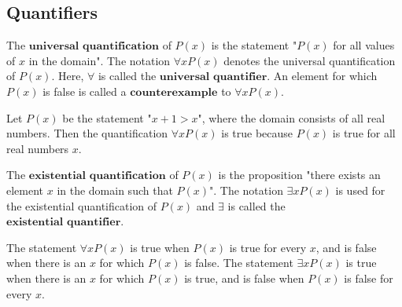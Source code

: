\documentclass{article}
\newtheorem{definition}{Definition}[subsection]
\newtheorem{remark}{Remark}[subsection]
\newtheorem{example}{Example}[subsection]
\begin{document}
\subsection{Quantifiers}
\begin{tcolorbox}
[colback=blue!5!white,colframe=blue!75!black,title=\begin{definition}
\end{definition}]
The $\textbf{universal quantification}$ of $P(x)$ is the statement "$P(x)$ for all values of $x$ in the domain". The notation $\forall xP(x)$ denotes the universal quantification of $P(x)$. Here, $\forall$ is called the $\textbf{universal quantifier}$. An element for which $P(x)$ is false is called a $\textbf{counterexample}$ to $\forall xP(x)$.
\end{tcolorbox}
\begin{tcolorbox}
[colback=red!5!white,colframe=red!75!black,title=\begin{example}
\end{example}]
Let $P(x)$ be the statement "$x+1>x$", where the domain consists of all real numbers. Then the quantification $\forall xP(x)$ is true because $P(x)$ is true for all real numbers $x$.
\end{tcolorbox}
\begin{tcolorbox}
[colback=blue!5!white,colframe=blue!75!black,title=\begin{definition}
\end{definition}]
The $\textbf{existential quantification}$ of $P(x)$ is the proposition "there exists an element $x$ in the domain such that $P(x)$". The notation $\exists xP(x)$ is used for the existential quantification of $P(x)$ and $\exists$ is called the $\textbf{existential quantifier}$.
\end{tcolorbox}
\begin{tcolorbox}
[colback=cyan!5!white,colframe=cyan!75!black,title=\begin{remark}
\end{remark}]
The statement $\forall xP(x)$ is true when $P(x)$ is true for every $x$, and is false when there is an $x$ for which $P(x)$ is false. The statement $\exists xP(x)$ is true when there is an $x$ for which $P(x)$ is true, and is false when $P(x)$ is false for every $x$.
\end{tcolorbox}
\end{document}
